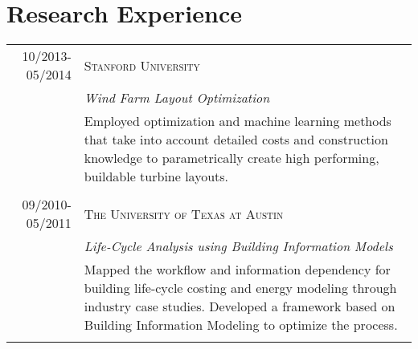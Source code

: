 \documentclass[a4paper,10pt]{article}
\begin{document}
\section{Research Experience}
\begin{tabularx}{\textwidth}{r|X}

 \textsc{10/2013-05/2014} &  \textsc{Stanford University}\\&\emph{Wind Farm Layout Optimization}\\&\footnotesize{Employed optimization and machine learning methods that take into account detailed costs and construction knowledge to parametrically create high performing, buildable turbine layouts.}\\\multicolumn{2}{c}{} \\

\textsc{09/2010-05/2011} &  \textsc{The University of Texas at Austin}\\&\emph{Life-Cycle Analysis using Building Information Models}\\&\footnotesize{
Mapped the workflow and information dependency for building life-cycle costing and energy modeling through industry case studies. Developed a framework based on Building Information Modeling to optimize the process.
}\\\multicolumn{2}{c}{} \\


\end{tabularx}




\end{document}
